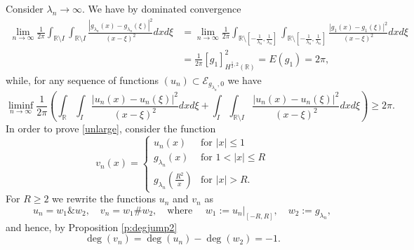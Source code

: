 \documentclass[12pt, a4paper]{article}
\newcommand{\M}[1]{\mathcal{#1}}
\newcommand{\sph}{\mathbb{S}}
\newcommand{\R}{\mathbb{R}}
\renewcommand{\(}{\left(}
\renewcommand{\)}{\right)}
\DeclareMathOperator{\intm}{\int\!\!\!\!\!\!\: --}
\DeclareMathOperator*{\Intm}{\int\!\!\!\!\!\!\! \rule[2.6pt]{10pt}{.4pt}}
\begin{document}
Consider $\lambda_n\to\infty$. We have by dominated convergence
\[
\begin{split}
\lim_{n\to\infty}\frac{1}{2\pi}\int_{\R\setminus I}\int_{\R\setminus I}\frac{|g_{\lambda_n}(x)-g_{\lambda_n}(\xi)|^2}{(x-\xi)^2}dxd\xi&=\lim_{n\to\infty}\frac{1}{2\pi}\int_{\R\setminus \left[-\tfrac{1}{\lambda_n},\tfrac{1}{\lambda_n}\right]}\int_{\R\setminus \left[-\tfrac{1}{\lambda_n},\tfrac{1}{\lambda_n}\right]}\frac{|g_1(x)-g_1(\xi)|^2}{(x-\xi)^2}dxd\xi\\
&=\frac{1}{2\pi}[g_1]_{H^{\frac{1}{2},2}(\R)}^2=E(g_1)=2\pi,
\end{split}
\]
while, for any sequence of functions $(u_n)\subset \M{E}_{g_{\lambda_n},0}$ we have
\begin{equation}\label{unlarge}
\liminf_{n\to\infty}\frac{1}{2\pi}\left(\int_{\R}\int_{I}\frac{|u_n(x)-u_n(\xi)|^2}{(x-\xi)^2}dxd\xi+\int_{I}\int_{\R\setminus I}\frac{|u_n(x)-u_n(\xi)|^2}{(x-\xi)^2}dxd\xi \right)  \ge 2\pi.
\end{equation}
In order to prove \eqref{unlarge}, consider the function
\begin{equation}\label{defvn}
v_n(x)=\begin{cases}
u_n(x)& \text{for }|x|\le 1\\[3mm]
g_{\lambda_n}\(x\)&\text{for }1<|x|\le R\\[3mm]
g_{\lambda_n}\(\tfrac{R^2}{ x}\) &\text{for }|x|>R.
\end{cases}
\end{equation}
For $R\geq2$ we rewrite the functions $u_n$ and $v_n$ as $$u_n=w_1\& w_2,\quad v_n=w_1\#w_2,\quad\text{where }\quad w_1:=u_n|_{[-R,R]},\quad  w_2:=g_{\lambda_n}, $$ and hence, by Proposition \ref{p:degjump2} $$\deg(v_n)=\deg(u_n)-\deg(w_2)=-1.$$
\end{document}
